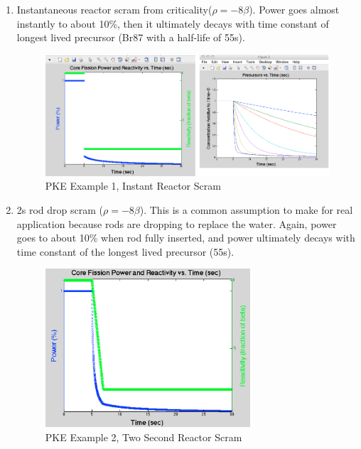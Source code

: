 \documentclass{school-22.211-notes}
\begin{document}
\clearpage
{}
\begin{enumerate}
\item Instantaneous reactor scram from criticality($\rho = - 8 \beta$). Power goes almost instantly to about 10\%, then it ultimately decays with time constant of longest lived precursor (Br87 with a half-life of 55s). 
  \begin{figure}[ht]
    \centering
    \includegraphics[width=5in]{images/pke/ex1.png}
    \caption{PKE Example 1, Instant Reactor Scram} 
  \end{figure}

\item 2s rod drop scram ($\rho = - 8 \beta$). This is a common assumption to make for real application because rods are dropping to replace the water. Again, power goes to about 10\% when rod fully inserted, and power ultimately decays with time constant of the longest lived precursor (55s).  
  \begin{figure}[ht]
    \centering
    \includegraphics[width=3in]{images/pke/ex2.png}
    \caption{PKE Example 2, Two Second Reactor Scram} 
  \end{figure}


\end{enumerate}
\end{document}
